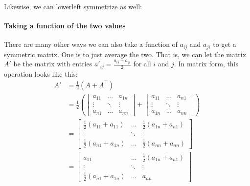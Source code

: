 \documentclass[letterpaper,10pt,english]{jupyterBook}
\begin{document}
\noindent{}

\sphinxAtStartPar
Likewise, we can lower\sphinxhyphen{}left symmetrize as well:

\begin{sphinxVerbatim}[commandchars=\\\{\}]
   
\end{sphinxVerbatim}

\noindent{}


\paragraph{Taking a function of the two values}
\label{\detokenize{representations/ch4/regularization:taking-a-function-of-the-two-values}}
\sphinxAtStartPar
There are many other ways we can also take a function of \(a_{ij}\) and \(a_{ji}\) to get a symmetric matrix. One is to just average the two. That is, we can let the matrix \(A'\) be the matrix with entries \(a'_{ij} = \frac{a_{ij} + a_{ji}}{2}\) for all \(i\) and \(j\). In matrix form, this operation looks like this:
\begin{align*}
    A' &= \frac{1}{2} (A + A^\top) \\
    &= \frac{1}{2}\left(\begin{bmatrix}
        a_{11} & ... & a_{1n} \\
        \vdots & \ddots & \vdots \\
        a_{n1} & ... & a_{nn}
    \end{bmatrix} + \begin{bmatrix}
        a_{11} & ... & a_{n1} \\
        \vdots & \ddots & \vdots \\
        a_{1n} & ... & a_{nn}
    \end{bmatrix}\right)\\
    &= \begin{bmatrix}
        \frac{1}{2}(a_{11} + a_{11}) & ... & \frac{1}{2}(a_{1n} + a_{n1}) \\
        \vdots & \ddots & \vdots \\
        \frac{1}{2} (a_{n1} + a_{1n}) & ... & \frac{1}{2}(a_{nn} + a_{nn})
    \end{bmatrix} \\
    &= \begin{bmatrix}
        a_{11} & ... & \frac{1}{2}(a_{1n} + a_{n1}) \\
        \vdots & \ddots & \vdots \\
        \frac{1}{2} (a_{n1} + a_{1n}) & ... & a_{nn}
    \end{bmatrix}
\end{align*}
\end{document}

